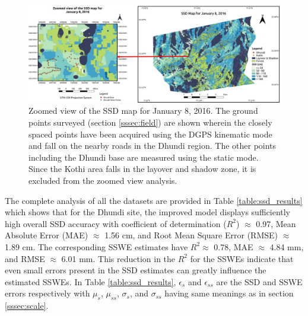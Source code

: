 \documentclass[12pt]{elsarticle}
\numberwithin{equation}{section}
\numberwithin{figure}{section}
\numberwithin{table}{section}
\begin{document}
\afterpage{\FloatBarrier}
\begin{figure}[htb]
    \centering
    \includegraphics[width=\textwidth]{Figures/Results/SSD.png}
    \caption{Zoomed view of the SSD map for January 8, 2016. The ground points surveyed (section \ref{sssec:field}) are shown wherein the closely spaced points have been acquired using the DGPS kinematic mode and fall on the nearby roads in the Dhundi region. The other points including the Dhundi base are measured using the static mode. Since the Kothi area falls in the layover and shadow zone, it is excluded from the zoomed view analysis.}
    \label{fig:ssd_map}
\end{figure}

The complete analysis of all the datasets are provided in Table \ref{table:ssd_results} which shows that for the Dhundi site, the improved model displays sufficiently high overall SSD accuracy with coefficient of determination ($R^2$) $\approx$ 0.97, Mean Absolute Error (MAE) $\approx$ 1.56 cm, and Root Mean Square Error (RMSE) $\approx$ 1.89 cm. The corresponding SSWE estimates have $R^2 \approx$ 0.78, MAE $\approx$ 4.84 mm, and RMSE $\approx$ 6.01 mm. This reduction in the $R^2$ for the SSWEs indicate that even small errors present in the SSD estimates can greatly influence the estimated SSWEs. In Table \ref{table:ssd_results}, $\epsilon_s$ and $\epsilon_{ss}$ are the SSD and SSWE errors respectively with $\mu_s$, $\mu_{ss}$, $\sigma_s$, and $\sigma_{ss}$ having same meanings as in section \ref{sssec:scale}.
\end{document}
